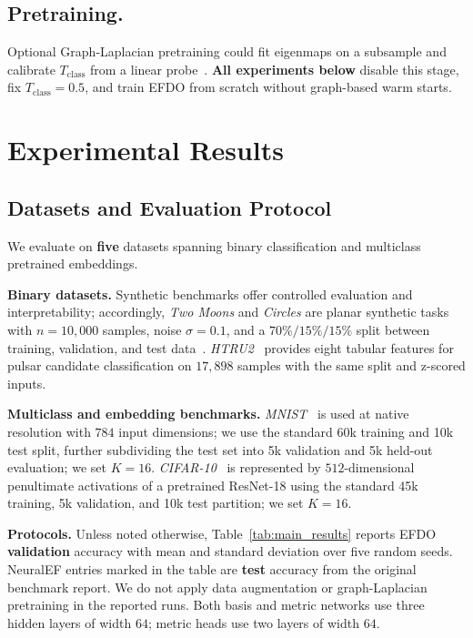 \documentclass{article}
\theoremstyle{plain}
\theoremstyle{definition}
\theoremstyle{remark}
\newcommand{\new}[1]{#1}
\begin{document}
\subsection{Pretraining.}
\label{subsec:pretraining}
Optional Graph-Laplacian pretraining could fit eigenmaps on a subsample and calibrate $T_{\mathrm{class}}$ from a linear probe~\cite{4476091}.
\textbf{All experiments below} disable this stage, fix $T_{\mathrm{class}}{=}0.5$, and train EFDO from scratch without graph-based warm starts.

\section{Experimental Results}
\label{sec:experimental_results}


\subsection{Datasets and Evaluation Protocol}
\label{subsec:datasets}

We evaluate on \textbf{five} datasets spanning binary classification and multiclass pretrained embeddings.

\textbf{Binary datasets.}
\new{Synthetic benchmarks offer controlled evaluation and interpretability; accordingly, } \emph{Two Moons} and \emph{Circles} are planar synthetic tasks with $n{=}10{,}000$ samples, noise $\sigma{=}0.1$, and a \(70\%/15\%/15\%\) split between training, validation, and test data~\citep{scikit-learn}.
\emph{HTRU2}~\citep{10.1093/mnras/stw656,Lyon2016} provides eight tabular features for pulsar candidate classification
on $17{,}898$ samples with the same split and z-scored inputs.

\textbf{Multiclass and embedding benchmarks.}
\emph{MNIST}~\citep{lecun-mnisthandwrittendigit-2010} is used at native resolution with $784$ input dimensions; \new{we use the standard 60k training and 10k test split, further subdividing the test set into 5k validation and 5k held-out evaluation}; we set $K{=}16$.
\emph{CIFAR-10}~\citep{Krizhevsky2009LearningML} is represented by $512$-dimensional penultimate activations of a pretrained ResNet-18 using the standard 45k training, 5k validation, and 10k test partition; we set $K{=}16$.

\textbf{Protocols.} Unless noted otherwise, Table~\ref{tab:main_results} reports EFDO \textbf{validation} accuracy with mean and standard deviation over five random seeds. NeuralEF entries marked in the table are \textbf{test} accuracy from the original benchmark report.
We do not apply data augmentation or graph-Laplacian pretraining in the reported runs.
Both basis and metric networks use three hidden layers of width $64$; metric heads use two layers of width $64$.
\end{document}
